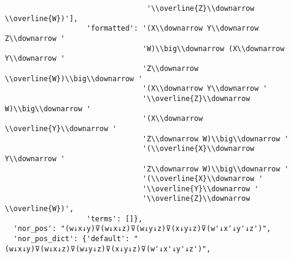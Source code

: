 \begin{verbatim}
                                 '\\overline{Z}\\downarrow \\overline{W})'],
                   'formatted': '(X\\downarrow Y\\downarrow Z\\downarrow '
                                'W)\\big\\downarrow (X\\downarrow Y\\downarrow '
                                'Z\\downarrow \\overline{W})\\big\\downarrow '
                                '(X\\downarrow Y\\downarrow '
                                '\\overline{Z}\\downarrow W)\\big\\downarrow '
                                '(X\\downarrow \\overline{Y}\\downarrow '
                                'Z\\downarrow W)\\big\\downarrow '
                                '(\\overline{X}\\downarrow Y\\downarrow '
                                'Z\\downarrow W)\\big\\downarrow '
                                '(\\overline{X}\\downarrow '
                                '\\overline{Y}\\downarrow '
                                '\\overline{Z}\\downarrow \\overline{W})',
                   'terms': []},
  'nor_pos': "(w↓x↓y)⊽(w↓x↓z)⊽(w↓y↓z)⊽(x↓y↓z)⊽(w'↓x'↓y'↓z')",
  'nor_pos_dict': {'default': "(w↓x↓y)⊽(w↓x↓z)⊽(w↓y↓z)⊽(x↓y↓z)⊽(w'↓x'↓y'↓z')",

\end{verbatim}
